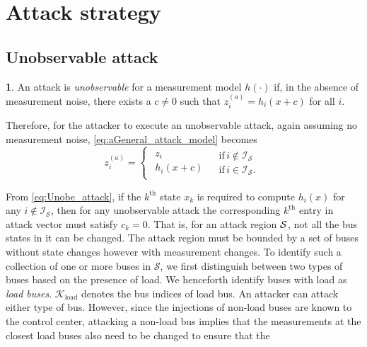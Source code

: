 \documentclass[twocolumn,english,final,journal]{IEEEtran}
\theoremstyle{plain}
\theoremstyle{definition}
\newtheorem{defn}[thm]{\protect\definitionname}
\providecommand{\definitionname}{Definition}
\begin{document}
\section{Attack strategy\label{sec:Attack-strategy}}


\subsection{Unobservable attack \label{sub:Unobservable-attack}}
\begin{defn}
An attack is \emph{unobservable} for a measurement model $h(\cdot)$
if, in the absence of measurement noise, there exists a $c\neq0$
such that $z_{i}^{(a)}=h_{i}(x+c)$ for all $i$.

Therefore, for the attacker to execute an unobservable attack, again
assuming no measurement noise, \eqref{eq:aGeneral_attack_model} becomes
\begin{equation}
z_{i}^{(a)}=\begin{cases}
\begin{array}{c}
z_{i}\qquad\quad\quad\\
h_{i}(x+c)
\end{array} & \begin{array}{c}
\mathrm{if}\, i\notin\mathcal{I_{S}}\\
\mathrm{if}\, i\in\mathcal{I_{S}}.
\end{array}\end{cases}\label{eq:Unobe_attack}
\end{equation}

\end{defn}
From \eqref{eq:Unobe_attack}, if the $k^{\mbox{th}}$ state $x_{k}$
is required to compute $h_{i}(x)$ for any $i\notin\mathcal{I_{S}}$,
then for any unobservable attack the corresponding $k^{\mbox{th}}$
entry in attack vector must satisfy $c_{k}=0$. That is, for an attack
region $\text{\ensuremath{\mathcal{S}}}$, not all the bus states
in it can be changed. The attack region must be bounded by a set of
buses without state changes however with measurement changes. To identify
such a collection of one or more buses in $\mathcal{S}$, we first
distinguish between two types of buses based on the presence of load.
We henceforth identify buses with load as \emph{load buses}. $\mathcal{K}_{\textrm{load}}$
denotes the bus indices of load bus. An attacker can attack either
type of bus. However, since the injections of non-load buses are known
to the control center, attacking a non-load bus implies that the measurements
at the closest load buses also need to be changed to ensure that the
\end{document}
